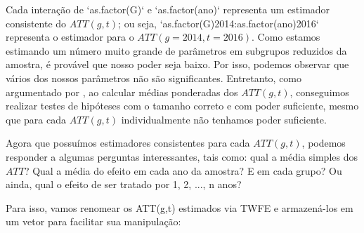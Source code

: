 \documentclass[portugues]{article}
\begin{document}
Cada interação de `as.factor(G)` e `as.factor(ano)` representa um estimador consistente do $ATT(g,t)$; ou seja, `as.factor(G)2014:as.factor(ano)2016` representa o estimador para o $ATT(g=2014, t=2016)$. Como estamos estimando um número muito grande de parâmetros em subgrupos reduzidos da amostra, é provável que nosso poder seja baixo. Por isso, podemos observar que vários dos nossos parâmetros não são significantes. Entretanto, como argumentado por \cite{callaway2021difference}, ao calcular médias ponderadas dos $ATT(g,t)$, conseguimos realizar testes de hipóteses com o tamanho correto e com poder suficiente, mesmo que para cada $ATT(g,t)$ individualmente não tenhamos poder suficiente.

Agora que possuímos estimadores consistentes para cada $ATT(g,t)$, podemos responder a algumas perguntas interessantes, tais como: qual a média simples dos $ATT$? Qual a média do efeito em cada ano da amostra? E em cada grupo? Ou ainda, qual o efeito de ser tratado por 1, 2, ..., n anos?

Para isso, vamos renomear os ATT(g,t) estimados via TWFE e armazená-los em um vetor para facilitar sua manipulação:
\end{document}
